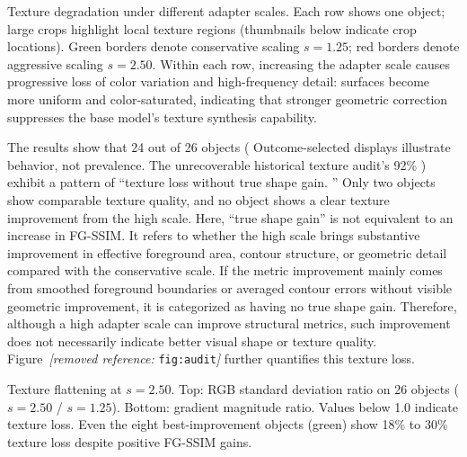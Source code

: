 \documentclass[times,twocolumn,final]{elsarticle}
\providecommand{\DIFadd}[1]{{\protect\color{blue} \sf #1}} %
\providecommand{\DIFdel}[1]{{\protect\color{red} \scriptsize #1}} %
\providecommand{\DIFaddbegin}{} %
\providecommand{\DIFaddend}{} %
\providecommand{\DIFdelbegin}{} %
\providecommand{\DIFdelend}{} %
\providecommand{\DIFdelFL}[1]{\DIFdel{#1}} %
\begin{document}
{%
\DIFdelFL{Texture degradation under different adapter scales. Each row shows one object; large crops highlight local texture regions (thumbnails below indicate crop locations). Green borders denote conservative scaling $s = 1.25$; red borders denote aggressive scaling $s = 2.50$. Within each row, increasing the adapter scale causes progressive loss of color variation and high-frequency detail: surfaces become more uniform and color-saturated, indicating that stronger geometric correction suppresses the base model's texture synthesis capability.}}

\DIFdel{The results show that 24 out of 26 objects (}\DIFdelend \DIFaddbegin \DIFadd{Outcome-selected displays illustrate behavior, not prevalence. The unrecoverable historical texture audit's }\DIFaddend 92\% \DIFdelbegin \DIFdel{) exhibit a pattern of ``texture loss without true shape gain.
'' Only two objects show comparable texture quality, and no object shows a clear texture improvement from the high scale. Here, ``true shape gain'' is not equivalent to an increase in FG-SSIM. It refers to whether the high scale brings substantive improvement in effective foreground area, contour structure, or geometric detail compared with the conservative scale. If the metric improvement mainly comes from smoothed foreground boundaries or averaged contour errors without visible geometric improvement, it is categorized as having no true shape gain. Therefore, although a high adapter scale can improve structural metrics, such improvement does not necessarily indicate better visual shape or texture quality. Figure~\textit{[removed reference: }\texttt{fig:audit}\textit{]} further quantifies this texture loss.
}%

{%
\DIFdelFL{Texture flattening at $s = 2.50$. Top: RGB standard deviation ratio on 26 objects ($s = 2.50$ / $s = 1.25$). Bottom: gradient magnitude ratio. Values below 1.0 indicate texture loss. Even the eight best-improvement objects (green) show 18\% to 30\% texture loss despite positive FG-SSIM gains.}}
\end{document}

